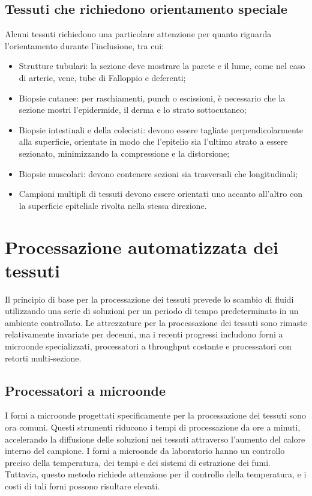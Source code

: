 \subsection{Tessuti che richiedono orientamento speciale}
Alcuni tessuti richiedono una particolare attenzione per quanto riguarda l'orientamento durante l'inclusione, tra cui:
\begin{itemize}
    \item Strutture tubulari: la sezione deve mostrare la parete e il lume, come nel caso di arterie, vene, tube di Falloppio e deferenti;
    \item Biopsie cutanee: per raschiamenti, punch o escissioni, è necessario che la sezione mostri l'epidermide, il derma e lo strato sottocutaneo;
    \item Biopsie intestinali e della colecisti: devono essere tagliate perpendicolarmente alla superficie, orientate in modo che l'epitelio sia l'ultimo strato a essere sezionato, minimizzando la compressione e la distorsione;
    \item Biopsie muscolari: devono contenere sezioni sia trasversali che longitudinali;
    \item Campioni multipli di tessuti devono essere orientati uno accanto all'altro con la superficie epiteliale rivolta nella stessa direzione.
\end{itemize}

\section{Processazione automatizzata dei tessuti}
Il principio di base per la processazione dei tessuti prevede lo scambio di fluidi utilizzando una serie di soluzioni per un periodo di tempo predeterminato in un ambiente controllato. Le attrezzature per la processazione dei tessuti sono rimaste relativamente invariate per decenni, ma i recenti progressi includono forni a microonde specializzati, processatori a throughput costante e processatori con retorti multi-sezione.

\subsection{Processatori a microonde}
I forni a microonde progettati specificamente per la processazione dei tessuti sono ora comuni. Questi strumenti riducono i tempi di processazione da ore a minuti, accelerando la diffusione delle soluzioni nei tessuti attraverso l'aumento del calore interno del campione. I forni a microonde da laboratorio hanno un controllo preciso della temperatura, dei tempi e dei sistemi di estrazione dei fumi. Tuttavia, questo metodo richiede attenzione per il controllo della temperatura, e i costi di tali forni possono risultare elevati.

